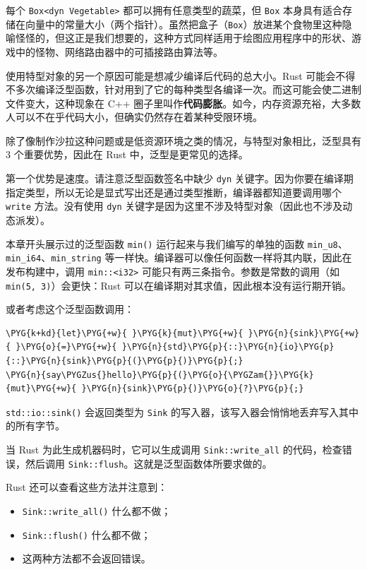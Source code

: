每个 \texttt{Box<dyn Vegetable>} 都可以拥有任意类型的蔬菜，但 \texttt{Box} 本身具有适合存储在向量中的常量大小（两个指针）。虽然把盒子（\texttt{Box}）放进某个食物里这种隐喻怪怪的，但这正是我们想要的，这种方式同样适用于绘图应用程序中的形状、游戏中的怪物、网络路由器中的可插接路由算法等。

使用特型对象的另一个原因可能是想减少编译后代码的总大小。Rust 可能会不得不多次编译泛型函数，针对用到了它的每种类型各编译一次。而这可能会使二进制文件变大，这种现象在 C++ 圈子里叫作\textbf{代码膨胀}。如今，内存资源充裕，大多数人可以不在乎代码大小，但确实仍然存在着某种受限环境。

除了像制作沙拉这种问题或是低资源环境之类的情况，与特型对象相比，泛型具有 3 个重要优势，因此在 Rust 中，泛型是更常见的选择。

第一个优势是速度。请注意泛型函数签名中缺少 \texttt{dyn} 关键字。因为你要在编译期指定类型，所以无论是显式写出还是通过类型推断，编译器都知道要调用哪个 \texttt{write} 方法。没有使用 \texttt{dyn} 关键字是因为这里不涉及特型对象（因此也不涉及动态派发）。

本章开头展示过的泛型函数 \texttt{min()} 运行起来与我们编写的单独的函数 \texttt{min\_u8}、\texttt{min\_i64}、\texttt{min\_string} 等一样快。编译器可以像任何函数一样将其内联，因此在发布构建中，调用 \texttt{min::<i32>} 可能只有两三条指令。参数是常数的调用（如 \texttt{min(5, 3)}）会更快：Rust 可以在编译期对其求值，因此根本没有运行期开销。

或者考虑这个泛型函数调用：

\begin{Verbatim}[commandchars=\\\{\},breaklines=true,breakanywhere=true,fontsize=\codefont,xleftmargin=17bp]
\PYG{k+kd}{let}\PYG{+w}{ }\PYG{k}{mut}\PYG{+w}{ }\PYG{n}{sink}\PYG{+w}{ }\PYG{o}{=}\PYG{+w}{ }\PYG{n}{std}\PYG{p}{::}\PYG{n}{io}\PYG{p}{::}\PYG{n}{sink}\PYG{p}{(}\PYG{p}{)}\PYG{p}{;}
\PYG{n}{say\PYGZus{}hello}\PYG{p}{(}\PYG{o}{\PYGZam{}}\PYG{k}{mut}\PYG{+w}{ }\PYG{n}{sink}\PYG{p}{)}\PYG{o}{?}\PYG{p}{;}
\end{Verbatim}

\texttt{std::io::sink()} 会返回类型为 \texttt{Sink} 的写入器，该写入器会悄悄地丢弃写入其中的所有字节。

当 Rust 为此生成机器码时，它可以生成调用 \texttt{Sink::write\_all} 的代码，检查错误，然后调用 \texttt{Sink::flush}。这就是泛型函数体所要求做的。

Rust 还可以查看这些方法并注意到：

\begin{itemize}
\item \texttt{Sink::write\_all()} 什么都不做；
\item \texttt{Sink::flush()} 什么都不做；
\item 这两种方法都不会返回错误。
\end{itemize}

